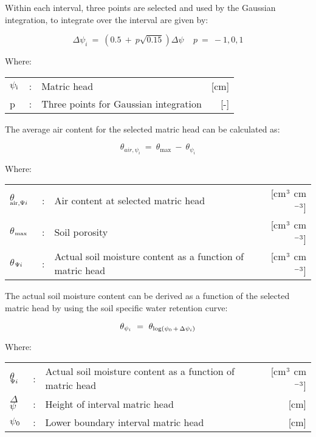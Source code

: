 Within each interval, three points are selected and used by the Gaussian integration, to
integrate over the interval are given by:

\begin{equation}
 \Delta  \psi _{i} ~=~ (0.5 ~+~ p \sqrt{0.15} ) \Delta  \psi ~~~~~p~=~-1,0,1
\end{equation}

Where:\\
\begin{tabularx}{\textwidth}{llXr}
$\psi$$_{{\rm i}}$ &:& Matric head   & [cm]\\
p &:& Three points for Gaussian integration  & [-]\\
\end{tabularx}

The average air content for the selected matric head can be calculated as:

\begin{equation}
\theta  _{air, \psi _{i} } ~=~ \theta _{\max } ~-~ \theta  _{\psi _{i} }
\end{equation}

Where:\\
\begin{tabularx}{\textwidth}{llXr}
$\theta$$_{{\rm air,}{\rm \Psi}{i}}$ &:& Air content at selected matric head  & [cm$^{{\rm 3}}$ cm$^{{\rm -3}}$]\\
$\theta$$_{{\rm max}}$ &:& Soil porosity  & [cm$^{{\rm 3}}$ cm$^{{\rm -3}}$]\\
$\theta$$_{{\rm \Psi}{i}}$ &:& Actual soil moisture content as a function of matric head  & [cm$^{{\rm 3}}$ cm$^{{\rm -3}}$]\\
\end{tabularx}

The actual soil moisture content can be derived as a function of the selected matric head
by using the soil specific water retention curve:

\begin{equation}
\theta_{\psi _{i} } ~=~ \theta_{{\rm log} (\psi_{0} \, +\, \Delta  \psi_{i} )}
\end{equation}

Where:\\
\begin{tabularx}{\textwidth}{llXr}
$\theta$$_{{\rm \Psi}{i}}$ &:& Actual soil moisture content as a function of 
    matric head  & [cm$^{{\rm 3}}$ cm$^{{\rm -3}}$]\\
$\Delta$$\psi$ &:& Height of interval matric head  & [cm]\\
$\psi$$_{{\rm 0}}$ &:& Lower boundary interval matric head  & [cm]\\
\end{tabularx}

